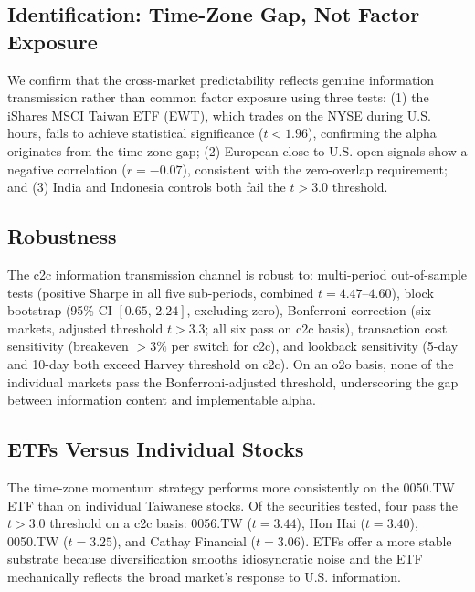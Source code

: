 \subsection{Identification: Time-Zone Gap, Not Factor Exposure}

We confirm that the cross-market predictability reflects genuine information transmission rather than common factor exposure using three tests: (1) the iShares MSCI Taiwan ETF (EWT), which trades on the NYSE during U.S. hours, fails to achieve statistical significance ($t < 1.96$), confirming the alpha originates from the time-zone gap; (2) European close-to-U.S.-open signals show a negative correlation ($r = -0.07$), consistent with the zero-overlap requirement; and (3) India and Indonesia controls both fail the $t > 3.0$ threshold.

\subsection{Robustness}

The c2c information transmission channel is robust to: multi-period out-of-sample tests (positive Sharpe in all five sub-periods, combined $t = 4.47$--$4.60$), block bootstrap (95\% CI $[0.65, \, 2.24]$, excluding zero), Bonferroni correction (six markets, adjusted threshold $t > 3.3$; all six pass on c2c basis), transaction cost sensitivity (breakeven $>3\%$ per switch for c2c), and lookback sensitivity (5-day and 10-day both exceed Harvey threshold on c2c). On an o2o basis, none of the individual markets pass the Bonferroni-adjusted threshold, underscoring the gap between information content and implementable alpha.

\subsection{ETFs Versus Individual Stocks}

The time-zone momentum strategy performs more consistently on the 0050.TW ETF than on individual Taiwanese stocks. Of the securities tested, four pass the \citet{harvey2016} $t > 3.0$ threshold on a c2c basis: 0056.TW ($t = 3.44$), Hon Hai ($t = 3.40$), 0050.TW ($t = 3.25$), and Cathay Financial ($t = 3.06$). ETFs offer a more stable substrate because diversification smooths idiosyncratic noise and the ETF mechanically reflects the broad market's response to U.S. information.
